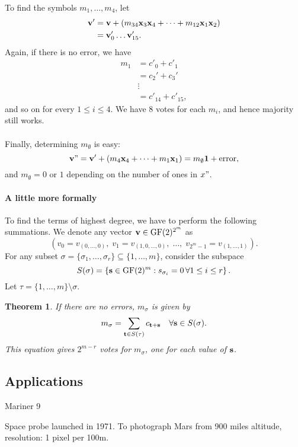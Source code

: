 \documentclass[a4paper, 11pt, openany]{book}
\numberwithin{equation}{section}
\theoremstyle{plain}
\newtheorem{theorem}	[equation]	{Theorem}
\theoremstyle{definition}
\newcommand{\GF}{\mathrm{GF}}
\begin{document}
To find the symbols $m_1, \dots, m_4$, let 
\begin{align*}
	{\bf v}' &= {\bf v} + (m_{34}{\bf x}_3 {\bf x}_4 + \dots + m_{12}{\bf x}_1 {\bf x}_2)\\
	&= {\bf v}'_0 \dots {\bf v}'_{15}.
\end{align*}
Again, if there is no error, we have
\begin{align*}
	m_1 &= c'_0 + c'_1\\
	&= c_2' + c_3'\\
	&\vdots\\
	&= c'_{14} + c'_{15},
\end{align*}
and so on for every $1 \le i \le 4$. We have 8 votes for each $m_i$, and hence majority still works.\\
~\\
Finally, determining $m_\emptyset$ is easy:
\[
	{\bf v}" = {\bf v}' + (m_4 {\bf x}_4 + \dots + m_1 {\bf x}_1) = m_\emptyset {\bf 1} + \text{error},
\]
and $m_\emptyset = 0$ or $1$ depending on the number of ones in $x"$.




\paragraph{A little more formally}
To find the terms of highest degree, we have to perform the following summations. We denote any vector ${\bf v} \in \GF(2)^{2^m}$ as
\[
	(v_0 = v_{(0, \dots, 0)}, \; v_1 = v_{(1,0,\dots,0)}, \; \dots, \; v_{2^m - 1} = v_{(1, \dots, 1)}).
\]
For any subset $\sigma = \{\sigma_1, \dots, \sigma_r\} \subseteq \{1, \dots, m\}$, consider the subspace
\[
	S(\sigma) = \left\{ {\bf s} \in \GF(2)^m : s_{\sigma_i} = 0 \,\forall 1 \le i \le r \right\}.
\]
Let $\tau = \{1, \dots, m\} \setminus \sigma$.

\begin{theorem} 
If there are no errors, $m_\sigma$ is given by
\[
	m_\sigma = \sum_{{\bf t} \in S(\tau)} c_{{\bf t} + {\bf s}} \quad \forall {\bf s} \in S(\sigma).
\]
This equation gives $2^{m-r}$ votes for $m_\sigma$, one for each value of ${\bf s}$.
\end{theorem}




\subsection{Applications}

Mariner 9


Space probe launched in 1971.
To photograph Mars from 900 miles
altitude, resolution: 1 pixel per 100m.
\end{document}
